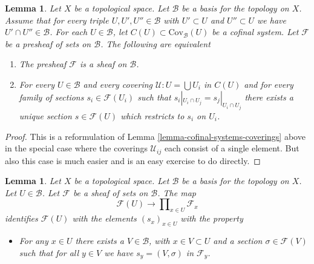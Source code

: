 \documentclass{stacks-project}
\theoremstyle{plain}
\newtheorem{lemma}[subsection]{Lemma}
\theoremstyle{definition}
\theoremstyle{remark}
\numberwithin{equation}{subsection}
\begin{document}
\begin{lemma}
\label{lemma-cofinal-systems-coverings-standard-case}
Let $X$ be a topological space. Let $\mathcal{B}$ be a basis for the
topology on $X$. Assume that for every triple $U, U', U'' \in \mathcal{B}$
with $U' \subset U$ and $U'' \subset U$ we have $U' \cap U'' \in \mathcal{B}$.
For each $U \in \mathcal{B}$, let $C(U) \subset \text{Cov}_\mathcal{B}(U)$
be a cofinal system.
Let $\mathcal{F}$ be a presheaf of sets on $\mathcal{B}$.
The following are equivalent
\begin{enumerate}
\item The presheaf $\mathcal{F}$ is a sheaf on $\mathcal{B}$.
\item For every $U \in \mathcal{B}$ and every covering
$\mathcal{U} : U = \bigcup U_i$ in $C(U)$ and for every
family of sections $s_i \in \mathcal{F}(U_i)$ such
that $s_i|_{U_i \cap U_j} = s_j|_{U_i \cap U_j}$ there
exists a unique section $s \in \mathcal{F}(U)$ which
restricts to $s_i$ on $U_i$.
\end{enumerate}
\end{lemma}

\begin{proof}
This is a reformulation of
Lemma \ref{lemma-cofinal-systems-coverings} above
in the special case where the coverings $\mathcal{U}_{ij}$
each consist of a single element. But also this case is much
easier and is an easy exercise to do directly.
\end{proof}

\begin{lemma}
\label{lemma-condition-star-sections}
Let $X$ be a topological space.
Let $\mathcal{B}$ be a basis for the topology on $X$.
Let $U \in \mathcal{B}$.
Let $\mathcal{F}$ be a sheaf of sets on $\mathcal{B}$.
The map
$$
\mathcal{F}(U) \to \prod\nolimits_{x \in U} \mathcal{F}_x
$$
identifies $\mathcal{F}(U)$ with the elements $(s_x)_{x\in U}$
with the property
\begin{itemize}
\item[(*)] For any $x \in U$ there exists a $V \in \mathcal{B}$,
with $x \in V \subset U$ and a section $\sigma \in \mathcal{F}(V)$
such that for all $y \in V$ we have $s_y = (V, \sigma)$ in $\mathcal{F}_y$.
\end{itemize}
\end{lemma}
\end{document}
